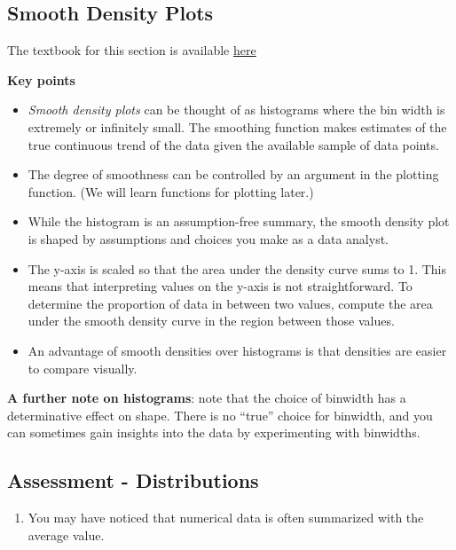 \documentclass[
]{article}
\providecommand{\tightlist}{%
  \setlength{\itemsep}{0pt}\setlength{\parskip}{0pt}}
\begin{document}
\hypertarget{smooth-density-plots}{%
\subsection{Smooth Density Plots}\label{smooth-density-plots}}

The textbook for this section is available
\href{https://rafalab.github.io/dsbook/distributions.html\#smoothed-density}{here}

\textbf{Key points}

\begin{itemize}
\tightlist
\item
  \emph{Smooth density plots} can be thought of as histograms where the
  bin width is extremely or infinitely small. The smoothing function
  makes estimates of the true continuous trend of the data given the
  available sample of data points.
\item
  The degree of smoothness can be controlled by an argument in the
  plotting function. (We will learn functions for plotting later.)
\item
  While the histogram is an assumption-free summary, the smooth density
  plot is shaped by assumptions and choices you make as a data analyst.
\item
  The y-axis is scaled so that the area under the density curve sums to
  1. This means that interpreting values on the y-axis is not
  straightforward. To determine the proportion of data in between two
  values, compute the area under the smooth density curve in the region
  between those values.
\item
  An advantage of smooth densities over histograms is that densities are
  easier to compare visually.
\end{itemize}

\textbf{A further note on histograms}: note that the choice of binwidth
has a determinative effect on shape. There is no ``true'' choice for
binwidth, and you can sometimes gain insights into the data by
experimenting with binwidths.

\newpage

\hypertarget{assessment---distributions}{%
\subsection{Assessment -
Distributions}\label{assessment---distributions}}

\begin{enumerate}
\def\labelenumi{\arabic{enumi}.}
\tightlist
\item
  You may have noticed that numerical data is often summarized with the
  average value.
\end{enumerate}
\end{document}
